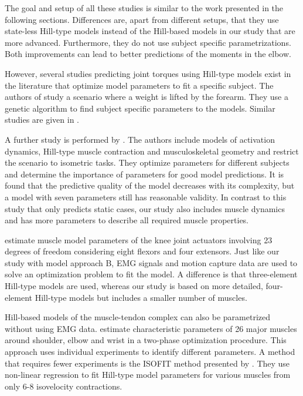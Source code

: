 The goal and setup of all these studies is similar to the work presented in the following sections. Differences are, apart from different setups, that they use state-less Hill-type models instead of the Hill-based models in our study that are more advanced. Furthermore, they do not use subject specific parametrizations. Both improvements can lead to better predictions of the moments in the elbow.

%
However, several studies predicting joint torques using Hill-type models exist in the literature that optimize model parameters to fit a specific subject.
The authors of \cite{Cavallaro2005, Cavallaro2006} study a scenario where a weight is lifted by the forearm. They use a genetic algorithm to find subject specific parameters to the models. Similar studies are given in \cite{Lloyd2003,Venture2005,Pontonnier2009,Sartori2012}.

A further study is performed by \cite{Heine2003}. The authors include models of activation dynamics, Hill-type muscle contraction and musculoskeletal geometry and restrict the scenario to isometric tasks. They optimize parameters for different subjects and determine the importance of parameters for good model predictions. It is found that the predictive quality of the model decreases with its complexity, but a model with seven parameters still has reasonable validity. 
In contrast to this study that only predicts static cases, our study also includes muscle dynamics and has more parameters to describe all required muscle properties.

\cite{Falisse2016} estimate muscle model parameters of the knee joint actuators involving 23 degrees of freedom considering eight flexors and four extensors. Just like our study with model approach B, EMG signals and motion capture data are used to solve an optimization problem to fit the model. A difference is that three-element Hill-type models are used, whereas our study is based on more detailed, four-element Hill-type models but includes a smaller number of muscles.

Hill-based models of the muscle-tendon complex can also be parametrized without using EMG data.
\cite{Garner2003} estimate characteristic parameters of 26 major muscles around shoulder, elbow and  wrist in a two-phase optimization procedure. This approach uses individual experiments to identify different parameters. A method that requires fewer experiments is the ISOFIT method presented by \cite{Wagner2005}. They use non-linear regression to fit Hill-type model parameters for various muscles from only 6-8 isovelocity contractions.

